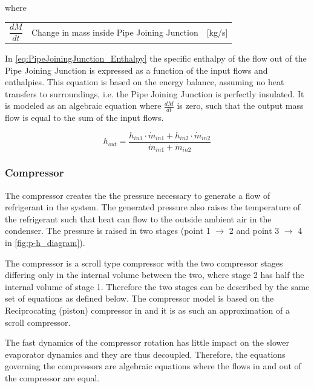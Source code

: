 where
\smallskip
\begin{center}
	\begin{tabular}{l p{8cm} l}
		$\dfrac{dM}{dt}$ & Change in mass inside Pipe Joining Junction             & [\si{kg}/\si{s}] \\
	\end{tabular}
\end{center}

\medskip
In \cref{eq:PipeJoiningJunction_Enthalpy} the specific enthalpy of the flow out of the Pipe Joining Junction is expressed as a function of the input flows and enthalpies. This equation is based on the energy balance, assuming no heat transfers to surroundings, i.e. the Pipe Joining Junction is perfectly insulated. It is modeled as an algebraic equation where $\frac{dM}{dt}$ is zero, such that the output mass flow is equal to the sum of the input flows.

\begin{equation} \label{eq:PipeJoiningJunction_Enthalpy}
	h_{out} = \frac{h_{in1} \cdot \dot{m}_{in1} + h_{in2} \cdot \dot{m}_{in2}}{ \dot{m}_{in1} + \dot{m}_{in2} }
\end{equation}




\subsubsection{Compressor}
The compressor creates the the pressure necessary to generate a flow of refrigerant in the system. The generated pressure also raises the temperature of the refrigerant such that heat can flow to the outside ambient air in the condenser. The pressure is raised in two stages (point 1 $\rightarrow$ 2 and point 3 $\rightarrow$ 4 in \cref{fig:p-h_diagram}).

The compressor is a scroll type compressor with the two compressor stages differing only in the internal volume between the two, where stage 2 has half the internal volume of stage 1. Therefore the two stages can be described by the same set of equations as defined below. The compressor model is based on the Reciprocating (piston) compressor in \cite{Sorensen2013} and it is as such an approximation of a scroll compressor.

The fast dynamics of the compressor rotation has little impact on the slower evaporator dynamics and they are thus decoupled. Therefore, the equations governing the compressors are algebraic equations where the flows in and out of the compressor are equal.

